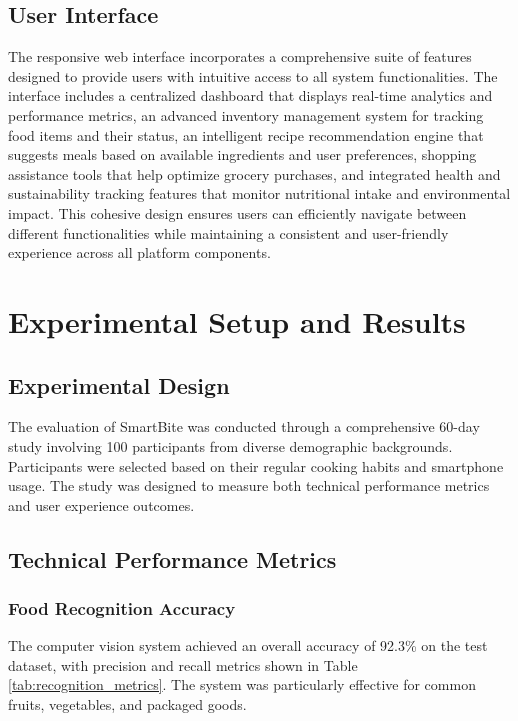 \documentclass[conference]{IEEEtran}
\begin{document}
\subsection{User Interface}
The responsive web interface incorporates a comprehensive suite of features designed to provide users with intuitive access to all system functionalities. The interface includes a centralized dashboard that displays real-time analytics and performance metrics, an advanced inventory management system for tracking food items and their status, an intelligent recipe recommendation engine that suggests meals based on available ingredients and user preferences, shopping assistance tools that help optimize grocery purchases, and integrated health and sustainability tracking features that monitor nutritional intake and environmental impact. This cohesive design ensures users can efficiently navigate between different functionalities while maintaining a consistent and user-friendly experience across all platform components.

\section{Experimental Setup and Results}

\subsection{Experimental Design}
The evaluation of SmartBite was conducted through a comprehensive 60-day study involving 100 participants from diverse demographic backgrounds. Participants were selected based on their regular cooking habits and smartphone usage. The study was designed to measure both technical performance metrics and user experience outcomes.

\subsection{Technical Performance Metrics}

\subsubsection{Food Recognition Accuracy}
The computer vision system achieved an overall accuracy of 92.3\% on the test dataset, with precision and recall metrics shown in Table \ref{tab:recognition_metrics}. The system was particularly effective for common fruits, vegetables, and packaged goods.
\end{document}
